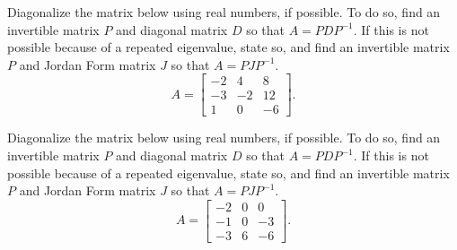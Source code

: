 \documentclass{ximera}
\begin{document}
\begin{exercise}
    Diagonalize the matrix below using real numbers, if possible. To do so, find an invertible matrix $P$ and diagonal matrix $D$ so that $A = PDP^{-1}$. If this is not possible because of a repeated eigenvalue, state so, and find an invertible matrix $P$ and Jordan Form matrix $J$ so that $A = PJP^{-1}$. 
    \[ 
        A = 
        \begin{bmatrix} 
            -2 & 4 &8\\ 
            -3 & -2& 12\\ 
            1 & 0 & -6 
        \end{bmatrix}.
    \]
\end{exercise} 

\begin{exercise}
    Diagonalize the matrix below using real numbers, if possible. To do so, find an invertible matrix $P$ and diagonal matrix $D$ so that $A = PDP^{-1}$. If this is not possible because of a repeated eigenvalue, state so, and find an invertible matrix $P$ and Jordan Form matrix $J$ so that $A = PJP^{-1}$. 
    \[ 
        A = 
        \begin{bmatrix} 
            -2 &0 & 0\\
            -1 & 0 &-3\\ 
            -3 &  6 & -6 
        \end{bmatrix}.
    \]
\end{exercise} 
\end{document}
